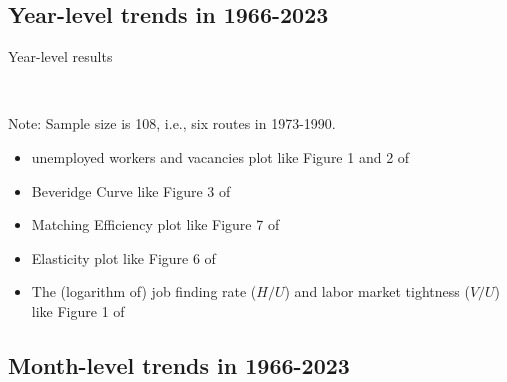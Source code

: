 \documentclass[12pt]{article}
\begin{document}
\subsection{Year-level trends in 1966-2023}

\begin{table}[!htbp]
  \begin{center}
      \caption{Year-level results}
       \\
      \subfloat[Beveridge Curve；X=U,Y=V]{
      } 
      \label{tb:year_level_results} 
  \end{center}
  \footnotesize
  Note: Sample size is 108, i.e., six routes in 1973-1990. 
\end{table} 

\begin{itemize}
    \item unemployed workers and vacancies plot like Figure 1 and 2 of \cite{lange2020beyond}
    \item Beveridge Curve like Figure 3 of \cite{lange2020beyond}
    \item Matching Efficiency plot like Figure 7 of \cite{lange2020beyond}
    \item Elasticity plot like Figure 6 of \cite{lange2020beyond}
    \item The (logarithm of) job finding rate ($H/U$) and labor market tightness ($V/U$) like Figure 1 of \cite{borowczyk2013accounting}
    
\end{itemize}

\subsection{Month-level trends in 1966-2023}
\end{document}

